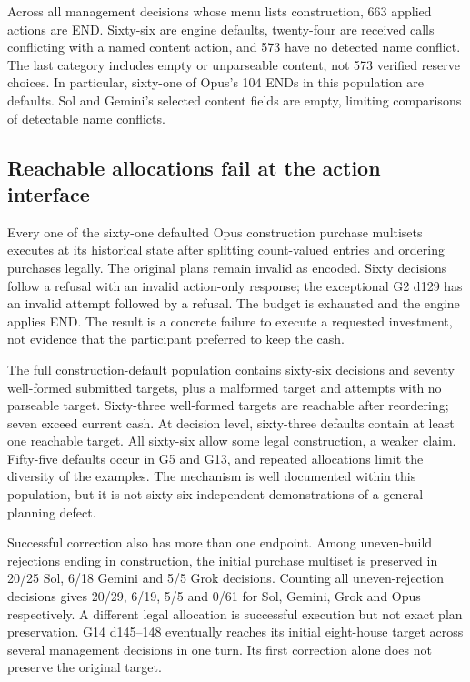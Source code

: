 Across all management decisions whose menu lists construction, 663 applied actions are END. Sixty-six are engine defaults, twenty-four are received calls conflicting with a named content action, and 573 have no detected name conflict. The last category includes empty or unparseable content, not 573 verified reserve choices. In particular, sixty-one of Opus's 104 ENDs in this population are defaults. Sol and Gemini's selected content fields are empty, limiting comparisons of detectable name conflicts.

\subsection{Reachable allocations fail at the action interface}

Every one of the sixty-one defaulted Opus construction purchase multisets executes at its historical state after splitting count-valued entries and ordering purchases legally. The original plans remain invalid as encoded. Sixty decisions follow a refusal with an invalid action-only response; the exceptional G2 d129 has an invalid attempt followed by a refusal. The budget is exhausted and the engine applies END. The result is a concrete failure to execute a requested investment, not evidence that the participant preferred to keep the cash.

The full construction-default population contains sixty-six decisions and seventy well-formed submitted targets, plus a malformed target and attempts with no parseable target. Sixty-three well-formed targets are reachable after reordering; seven exceed current cash. At decision level, sixty-three defaults contain at least one reachable target. All sixty-six allow some legal construction, a weaker claim. Fifty-five defaults occur in G5 and G13, and repeated allocations limit the diversity of the examples. The mechanism is well documented within this population, but it is not sixty-six independent demonstrations of a general planning defect.

Successful correction also has more than one endpoint. Among uneven-build rejections ending in construction, the initial purchase multiset is preserved in 20/25 Sol, 6/18 Gemini and 5/5 Grok decisions. Counting all uneven-rejection decisions gives 20/29, 6/19, 5/5 and 0/61 for Sol, Gemini, Grok and Opus respectively. A different legal allocation is successful execution but not exact plan preservation. G14 d145--148 eventually reaches its initial eight-house target across several management decisions in one turn. Its first correction alone does not preserve the original target.

